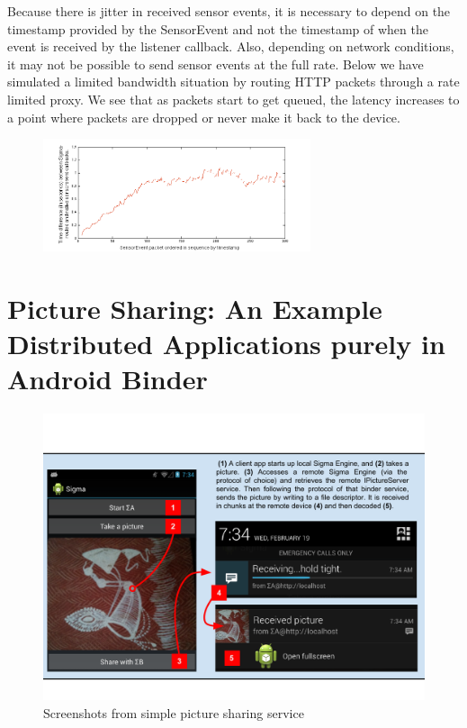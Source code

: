 \documentclass[prodmode]{acmlarge}
\begin{document}
Because there is jitter in received sensor events, it is necessary to depend on the timestamp provided by the SensorEvent and not the timestamp of when the event is received by the listener callback. Also, depending on network conditions, it may not be possible to send sensor events at the full rate. Below we have simulated a limited bandwidth situation by routing HTTP packets through a rate limited proxy. We see that as packets start to get queued, the latency increases to a point where packets are dropped or never make it back to the device.

\begin{figure}[h]
\centering
\includegraphics[width=0.7\textwidth]{plots/limited_bandwidth_increasing_latency.png}
\end{figure}

\section{Picture Sharing: An Example Distributed Applications purely in Android Binder}

\begin{figure}[h]
\centering
\includegraphics[width=\textwidth]{drawings/PictureChatExample.pdf}
\caption{Screenshots from simple picture sharing service}
\label{sec:ExampleApplication}
\end{figure}
\end{document}
